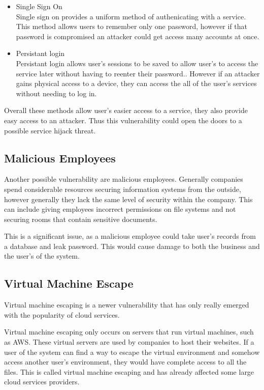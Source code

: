 \begin{itemize}
    \item Single Sign On\\
        Single sign on provides a uniform method of authenicating with a service. This method allows users to remember only one password, however if that password is compromised an attacker could get access many accounts at once\cite{lu_keeping_2014}.

    \item Persistant login\\
        Persistant login allows user's sessions to be saved to allow user's to access the service later without having to reenter their password.\cite{soares_secure_2013}. However if an attacker gains physical access to a device, they can access the all of the user's services without needing to log in.
\end{itemize}

Overall these methods allow user's easier access to a service, they also provide easy access to an attacker. Thus this vulnerability could open the doors to a possible service hijack threat.

\subsection{Malicious Employees}

Another possible vulnerability are malicious employees. Generally companies spend considerable resources securing information systems from the outside, however generally they lack the same level of security within the company. This can include giving employees incorrect permissions on file systems and not securing rooms that contain sensitive documents.

This is a significant issue, as a malicious employee could take user's records from a database and leak password. This would cause damage to both the business and the user's of the system.

\subsection{Virtual Machine Escape}

Virtual machine escaping is a newer vulnerability that has only really emerged with the popularity of cloud services\cite{ramachandran_recommendations_2014}.

Virtual machine escaping only occurs on servers that run virtual machines, such as AWS. These virtual servers are used by companies to host their websites. If a user of the system can find a way to escape the virtual environment and somehow access another user's environment, they would have complete access to all the files. This is called virtual machine escaping and has already affected some large cloud services providers\cite{cloudstrike_venom_2016}.

